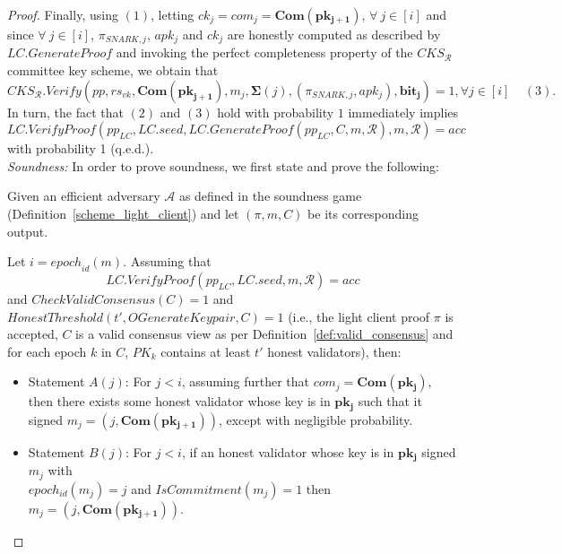 \begin{proof}
\noindent Finally, using $(1)$, letting $ \mathit{ck_j} = \mathit{com_j} = \mathbf{Com}(\mathbf{pk_{j+1}})$, $ \forall \ j \in [i]$ and since 
$\forall \ j \in [i]$, $\pi_{\mathit{SNARK,j}}$, $\mathit{apk_j}$ and $\mathit{ck_j}$ are honestly computed as described by  
$\mathit{LC.GenerateProof}$ and invoking the perfect completeness property of the $\mathit{CKS_{\mathcal{R}}}$ committee key scheme, 
we obtain that $$\mathit{CKS_{\mathcal{R}}.Verify}(\mathit{pp}, \mathit{rs}_{\mathit{vk}}, \mathbf{Com}(\mathbf{pk}_{\mathbf{j+1}}), 
m_j, \mathbf{\Sigma}(j), (\pi_{\mathit{SNARK,j}}, \mathit{apk_j}), \mathbf{bit_j}) = 1, \forall j \in [i]  \ \ \ \ \ (3).$$
In turn, the fact that $(2)$ and $(3)$ hold with probability $1$ immediately implies 
$$\mathit{LC.VerifyProof}(\mathit{pp}_{\mathit{LC}},\mathit{LC.seed}, \mathit{LC .GenerateProof}(\mathit{pp}_{\mathit{LC}}, C, m, \mathcal{R}),m, \mathcal{R}) = \mathit{acc}$$ with probability 1 (q.e.d.). \\

\noindent \textit{Soundness:} 
\noindent In order to prove soundness, we first state and prove the following: 
\begin{proposition} 
\label{le:lc_soundness}
Given an efficient adversary $\mathcal{A}$ as defined in the soundness game 
(Definition~\ref{scheme_light_client}) and let $(\pi, m, C)$ be its corresponding output. 

Let $i = \mathit{epoch}_{\mathit{id}}(m)$. Assuming that 
$$\mathit{LC.VerifyProof}(\mathit{pp}_{\mathit{LC}}, \mathit{LC.seed}, m, \mathcal{R}) = \mathit{acc}$$ and 
$\mathit{CheckValidConsensus}(C) = 1$ and 
$\mathit{HonestThreshold}(t', \mathit{OGenerateKeypair}, C) = 1$ (i.e., the light client proof $\pi$ is accepted, 
$C$ is a valid consensus view as per Definition~\ref{def:valid_consensus} and for each epoch $k$ in $C$, $PK_k$ 
contains at least $t'$ honest validators), then:
\begin{itemize}
\item Statement $A(j)$: For $ j < i$, assuming further that $\mathit{com_j} = \mathbf{Com}(\mathbf{pk_j})$, %
then there exists some honest validator whose key is in $\mathbf{pk_j}$ such that it signed 
$m_j = (j, \mathbf{Com}(\mathbf{pk_{j+1}}))$, except with negligible probability.
\item Statement $B(j)$: For $j < i$, if an honest validator whose key is in $\mathbf{pk_j}$ 
signed $m_j$ with \\ $\mathit{epoch_{\mathit{id}}}(m_j) = j$ and 
$\mathit{IsCommitment}(m_j) =1$ then $m_j= (j, \mathbf{Com}(\mathbf{pk_{j+1}}))$.
\end{itemize}
\end{proposition}


\end{proof}
